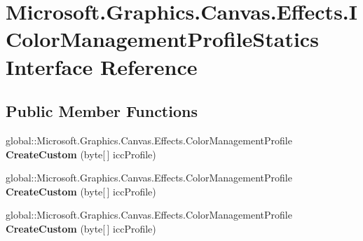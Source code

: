 \hypertarget{interface_microsoft_1_1_graphics_1_1_canvas_1_1_effects_1_1_i_color_management_profile_statics}{}\section{Microsoft.\+Graphics.\+Canvas.\+Effects.\+I\+Color\+Management\+Profile\+Statics Interface Reference}
\label{interface_microsoft_1_1_graphics_1_1_canvas_1_1_effects_1_1_i_color_management_profile_statics}
\subsection*{Public Member Functions}
\begin{DoxyCompactItemize}
\item 
\mbox{\label{interface_microsoft_1_1_graphics_1_1_canvas_1_1_effects_1_1_i_color_management_profile_statics_ae1838f1529a841f6e2fa36000faebc5e}} 
global\+::\+Microsoft.\+Graphics.\+Canvas.\+Effects.\+Color\+Management\+Profile {\bfseries Create\+Custom} (byte\mbox{[}$\,$\mbox{]} icc\+Profile)
\item 
\mbox{\label{interface_microsoft_1_1_graphics_1_1_canvas_1_1_effects_1_1_i_color_management_profile_statics_ae1838f1529a841f6e2fa36000faebc5e}} 
global\+::\+Microsoft.\+Graphics.\+Canvas.\+Effects.\+Color\+Management\+Profile {\bfseries Create\+Custom} (byte\mbox{[}$\,$\mbox{]} icc\+Profile)
\item 
\mbox{\label{interface_microsoft_1_1_graphics_1_1_canvas_1_1_effects_1_1_i_color_management_profile_statics_ae1838f1529a841f6e2fa36000faebc5e}} 
global\+::\+Microsoft.\+Graphics.\+Canvas.\+Effects.\+Color\+Management\+Profile {\bfseries Create\+Custom} (byte\mbox{[}$\,$\mbox{]} icc\+Profile)
\item 
\mbox{\label{interface_microsoft_1_1_graphics_1_1_canvas_1_1_effects_1_1_i_color_management_profile_statics_ae1838f1529a841f6e2fa36000faebc5e}} 

\end{DoxyCompactItemize}
